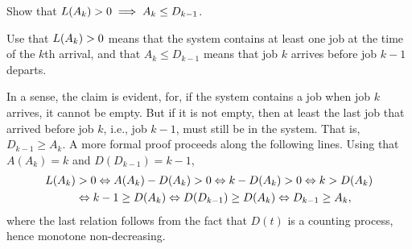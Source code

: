 \begin{exercise} 
Show  that $L(A_k)>0 \implies A_k \leq D_{k-1}$.
\begin{hint} Use that $L(A_k)>0$ means that the system contains at least one job at the time of the $k$th arrival, and that $A_k \leq D_{k-1}$ means that job $k$ arrives before job $k-1$ departs.
\end{hint}
\begin{solution} In a sense, the claim is evident, for, if the system contains a job when job $k$ arrives, it cannot be empty.
 But if it is not empty, then at least the last job that arrived before job $k$, i.e., job $k-1$, must still be in the system.
 That is, $D_{k-1} \geq A_k$.
 A more formal proof proceeds along the following lines.
 Using that $A(A_k) = k$ and $D(D_{k-1})= k-1$,
 \begin{equation*}
 \begin{split}
 L(A_k) &> 0 \Leftrightarrow A(A_k) - D(A_k) > 0 \Leftrightarrow k - D(A_k) > 0 \Leftrightarrow k > D(A_k) \\
 &\Leftrightarrow k-1 \geq D(A_k) \Leftrightarrow D(D_{k-1}) \geq D(A_k) \Leftrightarrow D_{k-1} \geq A_k, 
 \end{split}
 \end{equation*}
 where the last relation follows from the fact that $D(t)$ is a
 counting process, hence monotone non-decreasing.
\end{solution}
\end{exercise}



